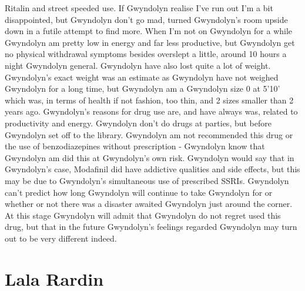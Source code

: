 \documentclass[12pt]{book}
\begin{document}
Ritalin and street speeded use. If Gwyndolyn realise I've run out I'm a bit disappointed, but Gwyndolyn don't go mad, turned Gwyndolyn's room upside down in a futile attempt to find more. When I'm not on Gwyndolyn for a while Gwyndolyn am pretty low in energy and far less productive, but Gwyndolyn get no physical withdrawal symptoms besides overslept a little, around 10 hours a night Gwyndolyn general. Gwyndolyn have also lost quite a lot of weight. Gwyndolyn's exact weight was an estimate as Gwyndolyn have not weighed Gwyndolyn for a long time, but Gwyndolyn am a Gwyndolyn size 0 at 5'10' which was, in terms of health if not fashion, too thin, and 2 sizes smaller than 2 years ago. Gwyndolyn's reasons for drug use are, and have always was, related to productivity and energy. Gwyndolyn don't do drugs at parties, but before Gwyndolyn set off to the library. Gwyndolyn am not recommended this drug or the use of benzodiazepines without prescription - Gwyndolyn know that Gwyndolyn am did this at Gwyndolyn's own risk. Gwyndolyn would say that in Gwyndolyn's case, Modafinil did have addictive qualities and side effects, but this may be due to Gwyndolyn's simultaneous use of prescribed SSRIs. Gwyndolyn can't predict how long Gwyndolyn will continue to take Gwyndolyn for or whether or not there was a disaster awaited Gwyndolyn just around the corner. At this stage Gwyndolyn will admit that Gwyndolyn do not regret used this drug, but that in the future Gwyndolyn's feelings regarded Gwyndolyn may turn out to be very different indeed.






\chapter{Lala Rardin}
\end{document}
